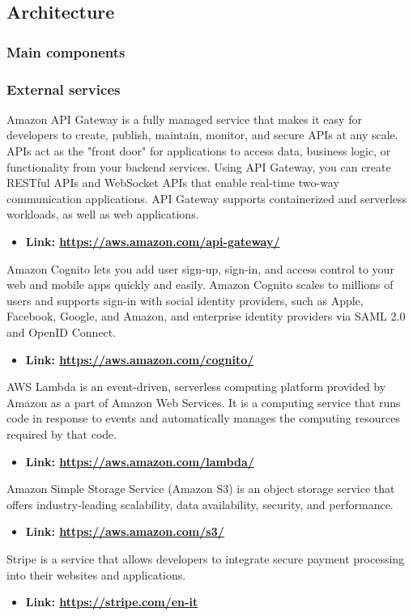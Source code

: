 \subsection{Architecture}
\subsubsection{Main components}
\subsubsection{External services}
Amazon API Gateway is a fully managed service that makes it easy for developers to create, publish, maintain, monitor,
and secure APIs at any scale. APIs act as the "front door" for applications to access data, business logic,
or functionality from your backend services. Using API Gateway, you can create RESTful APIs and WebSocket APIs that
enable real-time two-way communication applications. API Gateway supports containerized and serverless workloads,
as well as web applications.
\begin{itemize}
    \item \textbf{Link: \url{https://aws.amazon.com/api-gateway/}}
\end{itemize}
Amazon Cognito lets you add user sign-up, sign-in, and access control to your web and mobile apps quickly and easily.
Amazon Cognito scales to millions of users and supports sign-in with social identity providers, such as Apple,
Facebook, Google, and Amazon, and enterprise identity providers via SAML 2.0 and OpenID Connect.
\begin{itemize}
    \item \textbf{Link: \url{https://aws.amazon.com/cognito/}}
\end{itemize}
AWS Lambda is an event-driven, serverless computing platform provided by Amazon as a part of Amazon Web Services.
It is a computing service that runs code in response to events and automatically manages the computing resources required by that code.
\begin{itemize}
    \item \textbf{Link: \url{https://aws.amazon.com/lambda/}}
\end{itemize}
Amazon Simple Storage Service (Amazon S3) is an object storage service that offers industry-leading scalability,
data availability, security, and performance.
\begin{itemize}
    \item \textbf{Link: \url{https://aws.amazon.com/s3/}}
\end{itemize}
Stripe is a service that allows developers to integrate secure payment processing into their websites and applications.
\begin{itemize}
    \item \textbf{Link: \url{https://stripe.com/en-it}}
\end{itemize}
